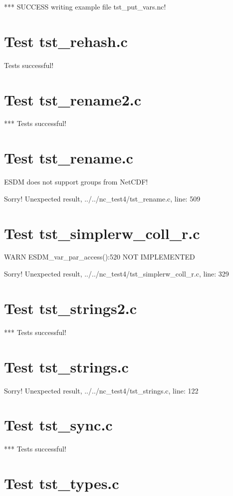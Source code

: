 *** SUCCESS writing example file tst\_put\_vars.nc!

\section{Test tst\_rehash.c}

Tests successful!

\section{Test tst\_rename2.c}

*** Tests successful!

\section{Test tst\_rename.c}

ESDM does not support groups from NetCDF!

Sorry! Unexpected result, ../../nc\_test4/tst\_rename.c, line: 509

\section{Test tst\_simplerw\_coll\_r.c}

WARN ESDM\_var\_par\_access():520 NOT IMPLEMENTED

Sorry! Unexpected result, ../../nc\_test4/tst\_simplerw\_coll\_r.c, line: 329

\section{Test tst\_strings2.c}

*** Tests successful!

\section{Test tst\_strings.c}

Sorry! Unexpected result, ../../nc\_test4/tst\_strings.c, line: 122

\section{Test tst\_sync.c}

*** Tests successful!

\section{Test tst\_types.c}

